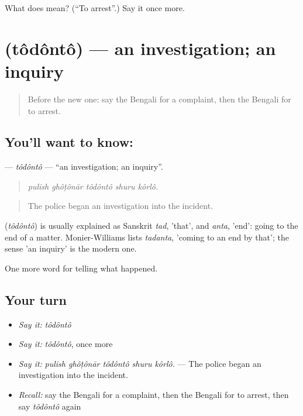 \begin{tcolorbox}[breakable,colback=teal!4,colframe=teal!35!black,title={Before you move on}]
What does   mean? (\textquotedblleft{}To arrest\textquotedblright{}.) Say it once more.
\end{tcolorbox}
\section[\texorpdfstring{\bn{তদন্ত} (tôdôntô)}{তদন্ত (tôdôntô)}]{ (tôdôntô) — an investigation; an inquiry}

\label{lesson:BN-C283-todonto}



\begin{quote}
Before the new one: say the Bengali for a complaint, then the Bengali for to arrest.
\end{quote}

\subsection*{You'll want to know: }
\textbf{} — \emph{tôdôntô} — \textquotedblleft{}an investigation; an inquiry\textquotedblright{}.

\begin{quote}
    
\end{quote}

\begin{quote}
\emph{pulish ghôṭônār tôdôntô shuru kôrlô.}
\end{quote}

\begin{quote}
The police began an investigation into the incident.
\end{quote}

\begin{cousinweb}
\textbf{} (\emph{tôdôntô}) is usually explained as Sanskrit \emph{tad}, 'that', and \emph{anta}, 'end': going to the end of a matter. Monier-Williams lists \emph{tadanta}, 'coming to an end by that'; the sense 'an inquiry' is the modern one.
\end{cousinweb}

\begin{grammarlens}[title={What you've built}]
One more word for telling what happened.
\end{grammarlens}

\subsection*{Your turn}
\begin{itemize}
\raggedright
  \item \emph{Say it:} \emph{tôdôntô}
  \item \emph{Say it:} \emph{tôdôntô}, once more
  \item \emph{Say it:} \emph{pulish ghôṭônār tôdôntô shuru kôrlô.} — The police began an investigation into the incident.
  \item \emph{Recall:} say the Bengali for a complaint, then the Bengali for to arrest, then say \emph{tôdôntô} again
\end{itemize}

